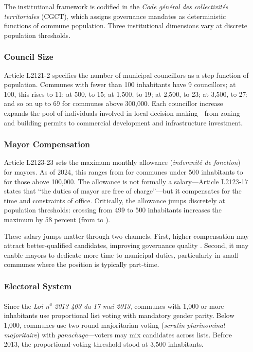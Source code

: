 \documentclass[12pt]{article}
\begin{document}
The institutional framework is codified in the \textit{Code g\'{e}n\'{e}ral des collectivit\'{e}s territoriales} (CGCT), which assigns governance mandates as deterministic functions of commune population. Three institutional dimensions vary at discrete population thresholds.

\subsubsection{Council Size}

Article L2121-2 specifies the number of municipal councillors as a step function of population. Communes with fewer than 100 inhabitants have 9 councillors; at 100, this rises to 11; at 500, to 15; at 1,500, to 19; at 2,500, to 23; at 3,500, to 27; and so on up to 69 for communes above 300,000. Each councillor increase expands the pool of individuals involved in local decision-making---from zoning and building permits to commercial development and infrastructure investment.

\subsubsection{Mayor Compensation}

Article L2123-23 sets the maximum monthly allowance (\textit{indemnit\'{e} de fonction}) for mayors. As of 2024, this ranges from  for communes under 500 inhabitants to  for those above 100,000. The allowance is not formally a salary---Article L2123-17 states that ``the duties of mayor are free of charge''---but it compensates for the time and constraints of office. Critically, the allowance jumps discretely at population thresholds: crossing from 499 to 500 inhabitants increases the maximum by 58 percent (from  to ).

These salary jumps matter through two channels. First, higher compensation may attract better-qualified candidates, improving governance quality \citep{ferraz2011, gagliarducci2013}. Second, it may enable mayors to dedicate more time to municipal duties, particularly in small communes where the position is typically part-time.

\subsubsection{Electoral System}

Since the \textit{Loi n\textsuperscript{o} 2013-403 du 17 mai 2013}, communes with 1,000 or more inhabitants use proportional list voting with mandatory gender parity. Below 1,000, communes use two-round majoritarian voting (\textit{scrutin plurinominal majoritaire}) with \textit{panachage}---voters may mix candidates across lists. Before 2013, the proportional-voting threshold stood at 3,500 inhabitants.
\end{document}
